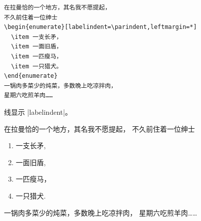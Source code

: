 \documentclass[a4paper]{ltxguide}
\begin{document}
\begin{verbatim}
在拉曼恰的一个地方，其名我不愿提起，
不久前住着一位绅士
\begin{enumerate}[labelindent=\parindent,leftmargin=*]
  \item 一支长矛，
  \item 一面旧盾，
  \item 一匹瘦马，
  \item 一只猎犬。
\end{enumerate}
一锅肉多菜少的炖菜，多数晚上吃凉拌肉，
星期六吃煎羊肉……
\end{verbatim}

线显示 |labelindent|。 

\samplesep

\showsep 在拉曼恰的一个地方，其名我不愿提起，
不久前住着一位绅士
\begin{enumerate}[labelindent=\parindent,leftmargin=*]
\item 一支长矛,
\item 一面旧盾,
\item 一匹瘦马，
\item 一只猎犬.
\end{enumerate}
一锅肉多菜少的炖菜，多数晚上吃凉拌肉，
星期六吃煎羊肉……

\newsample
\end{document}
